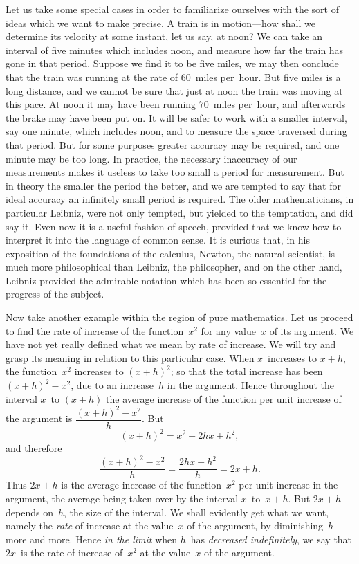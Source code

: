 \documentclass[12pt,leqno]{book}[2005/09/16]
\newcommand{\Typo}[2]{#2}
\newcommand{\PageSep}[1]{\ignorespaces}
\begin{document}
Let us take some special cases in order to
familiarize ourselves with the sort of ideas
which we want to make precise. A train is
in motion---how shall we determine its velocity
at some instant, let us say, at noon? We can
take an interval of five minutes which includes
noon, and measure how far the train has gone
in that period. Suppose we find it to be five
\PageSep{224}
miles, we may then conclude that the train
was running at the rate of $60$~miles per~hour.
But five miles is a long distance, and we
cannot be sure that just at noon the train
was moving at this pace. At noon it may
have been running $70$~miles per~hour, and
afterwards the \Typo{break}{brake} may have been put on.
It will be safer to work with a smaller interval,
say one minute, which includes noon, and to
measure the space traversed during that
period. But for some purposes greater
accuracy may be required, and one minute
may be too long. In practice, the necessary
inaccuracy of our measurements makes it
useless to take too small a period for measurement.
But in theory the smaller the period
the better, and we are tempted to say that
for ideal accuracy an infinitely small period
is required. The older mathematicians, in
particular Leibniz, were not only tempted,
but yielded to the temptation, and did say
it. Even now it is a useful fashion of speech,
provided that we know how to interpret it
into the language of common sense. It is
curious that, in his exposition of the foundations
of the calculus, Newton, the natural
scientist, is much more philosophical than
Leibniz, the philosopher, and on the other
hand, Leibniz provided the admirable notation
which has been so essential for the progress
of the subject.
\PageSep{225}

Now take another example within the region
of pure mathematics. Let us proceed to find
the rate of increase of the function~$x^{2}$ for
any value~$x$ of its argument. We have not
yet really defined what we mean by rate of
increase. We will try and grasp its meaning
in relation to this particular case. When $x$~increases
to $x + h$, the function~$x^{2}$ increases to
$(x + h)^{2}$; so that the total increase has been
$(x + h)^{2} - x^{2}$, due to an increase~$h$ in the argument.
Hence throughout the interval $x$~to
$(x + h)$ the average increase of the function per
unit increase of the argument is $\dfrac{(x + h)^{2} - x^{2}}{h}$.
But
\[
(x + h)^{2} = x^{2} + 2hx + h^{2},
\]
and therefore
\[
\frac{(x + h)^{2} - x^{2}}{h} = \frac{2hx + h^{2}}{h} = 2x + h.
\]
Thus $2x + h$ is the average increase of the
function~$x^{2}$ per unit increase in the argument,
the average being taken over by the interval
$x$~to~$x + h$. But $2x + h$ depends on~$h$, the size
of the interval. We shall evidently get what
we want, namely the \emph{rate} of increase at the
value~$x$ of the argument, by diminishing~$h$
more and more. Hence \emph{in the limit} when $h$~has
\PageSep{226}
%
\emph{decreased indefinitely}, we say that $2x$~is the
rate of increase of~$x^{2}$ at the value~$x$ of the
argument.
\end{document}
